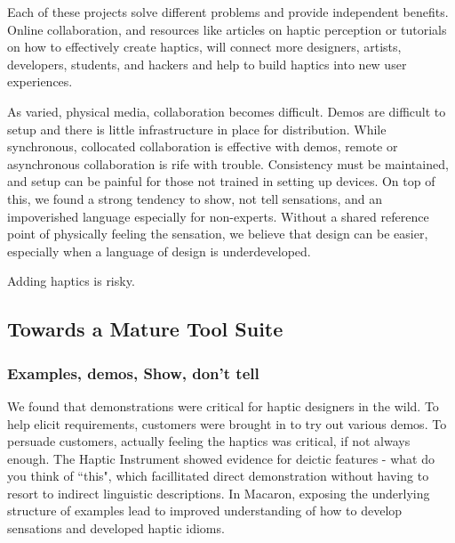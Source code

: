     Each of these projects solve different problems and provide independent benefits.
    Online collaboration, and resources like articles on haptic perception or tutorials on how to effectively create haptics, will connect more designers, artists, developers, students, and hackers and help to build haptics into new user experiences.



As varied, physical media, collaboration becomes difficult.
Demos are difficult to setup and there is little infrastructure in place for distribution.
While synchronous, collocated collaboration is effective with demos, remote or asynchronous collaboration is rife with trouble.
Consistency must be maintained, and setup can be painful for those not trained in setting up devices.
On top of this, we found a strong tendency to show, not tell sensations, and an impoverished language especially for non-experts.
Without a shared reference point of physically feeling the sensation, we believe that design can be easier, especially when a language of design is underdeveloped.


Adding haptics is risky.




%
%
\subsection{Towards a Mature \haxd Tool Suite}


\subsubsection{Examples, demos, Show, don't tell}
We found that demonstrations were critical for haptic designers in the wild.
To help elicit requirements, customers were brought in to try out various demos.
To persuade customers, actually feeling the haptics was critical, if not always enough.
The Haptic Instrument showed evidence for deictic features - what do you think of ``this", which facillitated direct demonstration without having to resort to indirect linguistic descriptions.
In Macaron, exposing the underlying structure of examples lead to improved understanding of how to develop sensations and developed haptic idioms.





